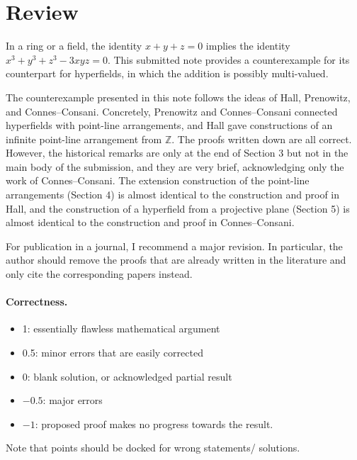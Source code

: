 \documentclass[11pt]{article}
\begin{document}
\maketitle

\section{Review}

In a ring or a field, the identity $x+y+z = 0$ implies the identity $x^3 + y^3 + z^3 - 3xyz = 0$. This submitted note provides a counterexample for its counterpart for hyperfields, in which the addition is possibly multi-valued. 

The counterexample presented in this note follows the ideas of Hall, Prenowitz, and Connes--Consani. Concretely, Prenowitz and Connes--Consani connected hyperfields with point-line arrangements, and Hall gave constructions of an infinite point-line arrangement from $\mathbb{Z}$. The proofs written down are all correct. However, the historical remarks are only at the end of Section 3 but not in the main body of the submission, and they are very brief, acknowledging only the work of Connes--Consani. The extension construction of the point-line arrangements (Section 4) is almost identical to the construction and proof in Hall, and the construction of a hyperfield from a projective plane (Section 5) is almost identical to the construction and proof in Connes--Consani. 

For publication in a journal, I recommend a major revision. In particular, the author should remove the proofs that are already written in the literature and only cite the corresponding papers instead. 


\paragraph{Correctness.}
\begin{itemize}
	\item  1: essentially flawless mathematical argument
	\item  0.5: minor errors that are easily corrected
	\item  0: blank solution, or acknowledged partial result
	\item  $-0.5$: major errors
	\item  $-1$: proposed proof makes no progress towards the result.
\end{itemize}
Note that points should be docked for wrong statements/ solutions.
\end{document}
